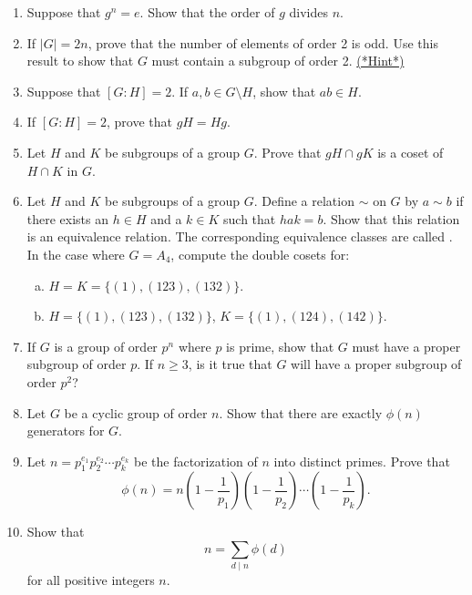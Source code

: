 \begin{enumerate}
\item
Suppose that $g^n = e$. Show that the order of $g$ divides
$n$.
 

\item \label{eoc:Cosets:1}
If $|G| = 2n$, prove that the number of elements of order 2 is odd.  Use this result to show that $G$ must contain a subgroup of order 2.
\hyperref[sec:Cosets:Hints]{(*Hint*)}

\item
Suppose that $[G : H] = 2$. If $a, b \in G \setminus H$, show that $ab \in H$.

\item
If $[G : H] = 2$, prove that $gH = Hg$.

\item
Let $H$ and $K$ be subgroups of a group $G$.  Prove that $gH \cap gK$ is a coset of $H \cap K$ in $G$.  
 
\item
Let $H$ and $K$ be subgroups of a group $G$.  Define a relation $\sim$ on $G$ by $a \sim b$ if there exists an $h \in H$ and a $k \in K$ such that $hak = b$.  Show that this relation is an equivalence relation.  The corresponding equivalence classes are called .  In the case where $G = A_4$, compute the double cosets for:
\begin{enumerate}[(a)]
\item
$H = K =  \{ (1),(123), (132) \}$.
\item
$H  =  \{ (1),(123), (132) \}$, $K  =  \{ (1),(124), (142) \}$. 
\end{enumerate}
 
\item
If $G$ is a group of order $p^n$ where $p$ is prime, show that $G$ must have a proper subgroup of order $p$.  If $n \geq 3$, is it true that $G$ will have a proper subgroup of order $p^2$?
 
\item
Let $G$ be a cyclic group of order $n$.  Show that there are exactly $\phi(n)$ generators for $G$.

\item
Let $n = p_1^{e_1} p_2^{e_2} \cdots p_k^{e_k}$ be the factorization of $n$ into distinct primes.  Prove that
\[
\phi(n) =  n 
\left( 1- \frac{1}{p_1} \right)
\left( 1- \frac{1}{p_2} \right)	\cdots
\left( 1- \frac{1}{p_k} \right).
\]

\item
Show that 
\[
n = \sum_{d \mid n} \phi(d)
\]
for all positive integers $n$.

\end{enumerate}



